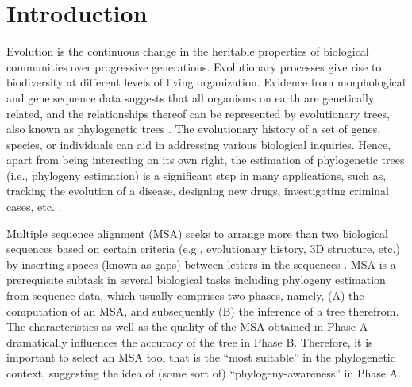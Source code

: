 \chapter{Introduction}
\label{ch:introduction}
Evolution is the continuous change in the heritable properties of biological communities over progressive generations. Evolutionary processes give rise to biodiversity at different levels of living organization. 
Evidence from morphological and gene sequence data suggests that all organisms on earth are genetically related, and the relationships thereof can be represented by evolutionary trees, also known as phylogenetic trees \cite{warnow2017computational}. The evolutionary history of a set of genes, species, or individuals can aid in addressing various biological inquiries. Hence, apart from being interesting on its own right, the estimation of phylogenetic trees (i.e., phylogeny estimation) is a significant step in many applications, such as, tracking the evolution of a disease, designing new drugs, investigating criminal cases, etc. \cite{bush1999predicting, aluru2005handbook}. 

Multiple sequence alignment (MSA) seeks to arrange more than two biological sequences based on certain criteria (e.g., evolutionary history, 3D structure, etc.) by inserting spaces (known as gaps) between letters in the sequences \cite{warnow2017computational}. MSA is a prerequisite subtask in several biological tasks including phylogeny estimation from sequence data, which usually comprises two phases, namely, (A) the computation of an MSA, and subsequently (B) the inference of a tree therefrom. The characteristics as well as the quality of the MSA obtained in Phase A dramatically influences the accuracy of the tree in Phase B. Therefore, it is important to select an MSA tool that is the “most suitable” in the phylogenetic context, suggesting the idea of (some sort of) “phylogeny-awareness” in Phase A. 

